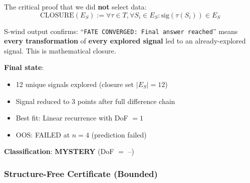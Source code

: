 \documentclass[twocolumn,showpacs,preprintnumbers,amsmath,amssymb,prl]{revtex4-2}
\begin{document}
The critical proof that we did \textbf{not} select data:
\begin{equation}
\boxed{\text{CLOSURE}(E_S) := \forall \tau \in T, \forall S_i \in E_S: \text{sig}(\tau(S_i)) \in E_S}
\end{equation}

S-wind output confirms: ``\texttt{FATE CONVERGED: Final answer reached}'' means \textbf{every transformation} of \textbf{every explored signal} led to an already-explored signal. This is mathematical closure.

\textbf{Final state}:
\begin{itemize}
    \item 12 unique signals explored (closure set $|E_S| = 12$)
    \item Signal reduced to 3 points after full difference chain
    \item Best fit: Linear recurrence with DoF $= 1$
    \item OOS: FAILED at $n = 4$ (prediction failed)
\end{itemize}

\textbf{Classification}: \textbf{MYSTERY} (DoF $=$ --)

\subsubsection{Structure-Free Certificate (Bounded)}

\begin{center}
\end{center}
\end{document}
